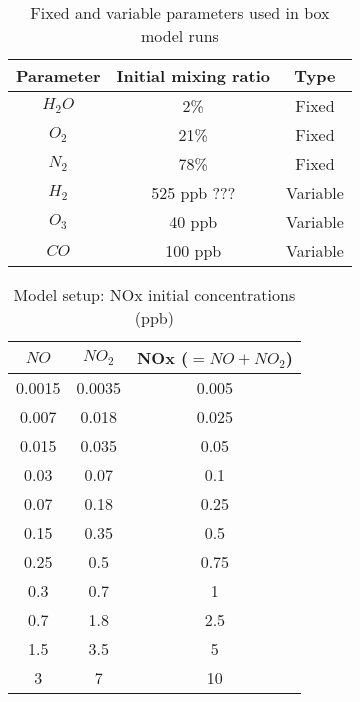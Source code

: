 \documentclass[11pt,a4paper]{article}
\begin{document}
\begin{table} %
\caption{Fixed and variable parameters used in box model runs}
\centering
\begin{tabular}{ccc}
\hline
Parameter & Initial mixing ratio & Type \\
\hline
$H_2O$    & 2\%                  & Fixed    \\
$O_2$     & 21\%                 & Fixed    \\
$N_2$     & 78\%                 & Fixed    \\
$H_2$     & 525 ppb  ???         & Variable \\
$O_3$     & 40 ppb               & Variable \\
$CO$      & 100 ppb              & Variable \\
\hline
\end{tabular}
\end{table}	

\begin{table} %
\caption{Model setup: NOx initial concentrations (ppb)}
\centering
\begin{tabular}{ccc}
\hline
$NO$      & $NO_2$      & NOx  ($=NO+NO_2$) \\
\hline
0.0015    & 0.0035      & 0.005 \\
0.007     & 0.018       & 0.025 \\
0.015     & 0.035       & 0.05  \\
0.03      & 0.07        & 0.1   \\
0.07      & 0.18        & 0.25  \\
0.15      & 0.35        & 0.5   \\
0.25      & 0.5         & 0.75  \\
0.3       & 0.7         & 1     \\
0.7       & 1.8         & 2.5   \\
1.5       & 3.5         & 5     \\
3         & 7           & 10    \\
\hline
\end{tabular}
\end{table}	
\end{document}
